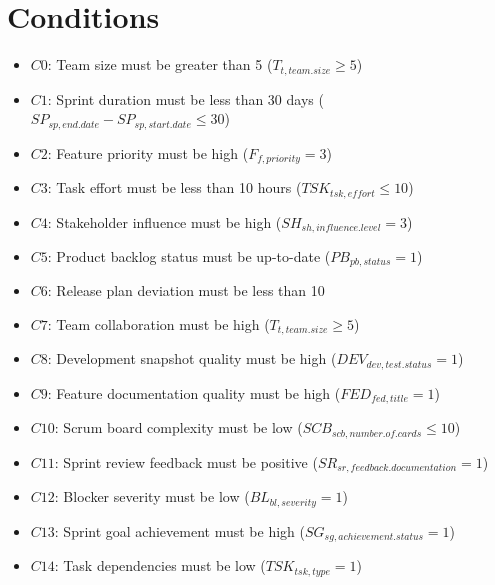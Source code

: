 \documentclass{article}
\begin{document}
\section{Conditions}
\begin{itemize}
    \item $C0$: Team size must be greater than 5 ($T_{t,team.size} \geq 5$)
    \item $C1$: Sprint duration must be less than 30 days ($SP_{sp,end.date} - SP_{sp,start.date} \leq 30$)
    \item $C2$: Feature priority must be high ($F_{f,priority} = 3$)
    \item $C3$: Task effort must be less than 10 hours ($TSK_{tsk,effort} \leq 10$)
    \item $C4$: Stakeholder influence must be high ($SH_{sh,influence.level} = 3$)
    \item $C5$: Product backlog status must be up-to-date ($PB_{pb,status} = 1$)
    \item $C6$: Release plan deviation must be less than 10%
    \item $C7$: Team collaboration must be high ($T_{t,team.size} \geq 5$)
    \item $C8$: Development snapshot quality must be high ($DEV_{dev,test.status} = 1$)
    \item $C9$: Feature documentation quality must be high ($FED_{fed,title} = 1$)
    \item $C10$: Scrum board complexity must be low ($SCB_{scb,number.of.cards} \leq 10$)
    \item $C11$: Sprint review feedback must be positive ($SR_{sr,feedback.documentation} = 1$)
    \item $C12$: Blocker severity must be low ($BL_{bl,severity} = 1$)
    \item $C13$: Sprint goal achievement must be high ($SG_{sg,achievement.status} = 1$)
    \item $C14$: Task dependencies must be low ($TSK_{tsk,type} = 1$)
\end{itemize}
\end{document}
